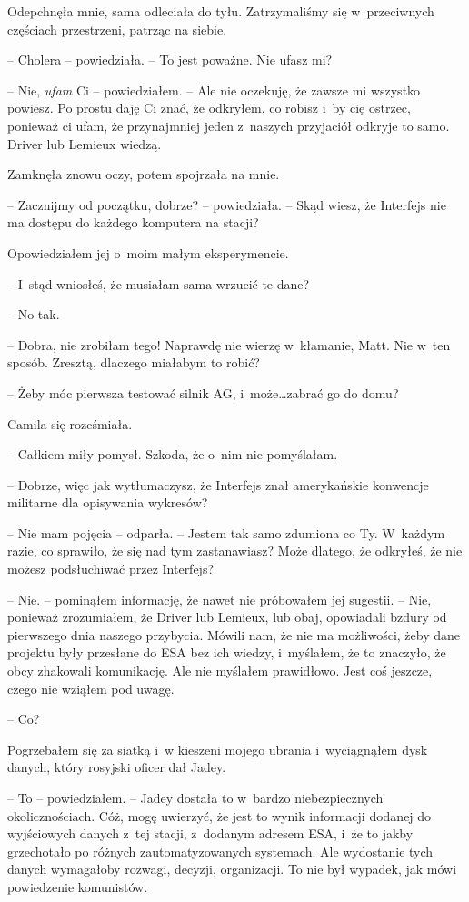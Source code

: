 \documentclass[oneside,polish,12pt,sfheadings]{mwbk}
\begin{document}
Odepchnęła mnie, sama odleciała do tyłu. Zatrzymaliśmy się w~przeciwnych
częściach przestrzeni, patrząc na siebie.

-- Cholera -- powiedziała. -- To jest poważne. Nie ufasz mi?

-- Nie, \emph{ufam} Ci -- powiedziałem. -- Ale nie oczekuję, że zawsze mi
wszystko powiesz. Po prostu daję Ci znać, że odkryłem, co robisz i~by
cię ostrzec, ponieważ ci ufam, że przynajmniej jeden z~naszych
przyjaciół odkryje to samo. Driver lub Lemieux wiedzą.

Zamknęła znowu oczy, potem spojrzała na mnie.

-- Zacznijmy od początku, dobrze? -- powiedziała. -- Skąd wiesz, że
Interfejs nie ma dostępu do każdego komputera na stacji?

Opowiedziałem jej o~moim małym eksperymencie.

-- I~stąd wniosłeś, że musiałam sama wrzucić te dane?

-- No tak.

-- Dobra, nie zrobiłam tego! Naprawdę nie wierzę w~kłamanie, Matt. Nie w~ten sposób. Zresztą, dlaczego miałabym to robić?

-- Żeby móc pierwsza testować silnik AG, i~może\ldots zabrać go do domu?

Camila się roześmiała. 

-- Całkiem miły pomysł. Szkoda, że o~nim nie pomyślałam.

-- Dobrze, więc jak wytłumaczysz, że Interfejs znał amerykańskie
konwencje militarne dla opisywania wykresów?

-- Nie mam pojęcia -- odparła. -- Jestem tak samo zdumiona co Ty. W~każdym
razie, co sprawiło, że się nad tym zastanawiasz? Może dlatego, że
odkryłeś, że nie możesz podsłuchiwać przez Interfejs?

-- Nie. -- pominąłem informację, że nawet nie próbowałem jej sugestii. -- Nie, ponieważ zrozumiałem, że Driver lub Lemieux, lub obaj, opowiadali
bzdury od pierwszego dnia naszego przybycia. Mówili nam, że nie ma
możliwości, żeby dane projektu były przesłane do ESA bez ich wiedzy, i~myślałem, że to znaczyło, że obcy zhakowali komunikację. Ale nie
myślałem prawidłowo. Jest coś jeszcze, czego nie wziąłem pod uwagę.

-- Co?

Pogrzebałem się za siatką i~w kieszeni mojego ubrania i~wyciągnąłem dysk
danych, który rosyjski oficer dał Jadey.

-- To -- powiedziałem. -- Jadey dostała to w~bardzo niebezpiecznych
okolicznościach. Cóż, mogę uwierzyć, że jest to wynik informacji dodanej
do wyjściowych danych z~tej stacji, z~dodanym adresem ESA, i~że to jakby
grzechotało po różnych zautomatyzowanych systemach. Ale wydostanie tych
danych wymagałoby rozwagi, decyzji, organizacji. To nie był wypadek, jak
mówi powiedzenie komunistów.
\end{document}

